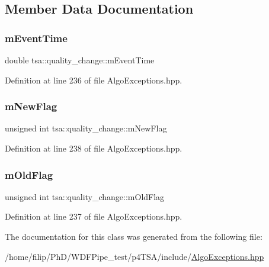 \subsection{Member Data Documentation}
\mbox{\label{classtsa_1_1quality__change_a5bbdd6247455082169c25acf8c092186}} 
\subsubsection{\texorpdfstring{m\+Event\+Time}{mEventTime}}
{\footnotesize\ttfamily double tsa\+::quality\+\_\+change\+::m\+Event\+Time\hspace{0.3cm}{\ttfamily [private]}}



Definition at line 236 of file Algo\+Exceptions.\+hpp.

\mbox{\label{classtsa_1_1quality__change_a90e75c508ba37e01d11727853e401919}} 
\subsubsection{\texorpdfstring{m\+New\+Flag}{mNewFlag}}
{\footnotesize\ttfamily unsigned int tsa\+::quality\+\_\+change\+::m\+New\+Flag\hspace{0.3cm}{\ttfamily [private]}}



Definition at line 238 of file Algo\+Exceptions.\+hpp.

\mbox{\label{classtsa_1_1quality__change_aca073076da85ec9eab1fa6d9b7e99a2b}} 
\subsubsection{\texorpdfstring{m\+Old\+Flag}{mOldFlag}}
{\footnotesize\ttfamily unsigned int tsa\+::quality\+\_\+change\+::m\+Old\+Flag\hspace{0.3cm}{\ttfamily [private]}}



Definition at line 237 of file Algo\+Exceptions.\+hpp.



The documentation for this class was generated from the following file\+:\begin{DoxyCompactItemize}
\item 
/home/filip/\+Ph\+D/\+W\+D\+F\+Pipe\+\_\+test/p4\+T\+S\+A/include/\hyperlink{_algo_exceptions_8hpp}{Algo\+Exceptions.\+hpp}\end{DoxyCompactItemize}

